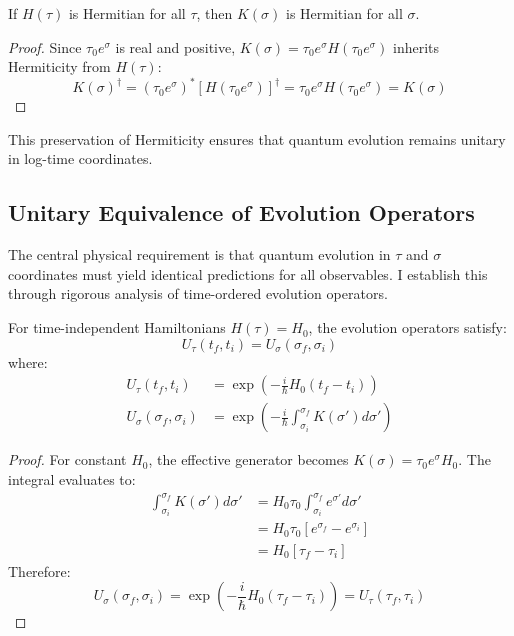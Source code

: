 \begin{corollary}
If $H(\tau)$ is Hermitian for all $\tau$, then $K(\sigma)$ is Hermitian for all $\sigma$.
\end{corollary}

\begin{proof}
Since $\tau_0 e^\sigma$ is real and positive, $K(\sigma) = \tau_0 e^\sigma H(\tau_0 e^\sigma)$ inherits Hermiticity from $H(\tau)$:
\begin{equation}
K(\sigma)^\dagger = (\tau_0 e^\sigma)^* [H(\tau_0 e^\sigma)]^\dagger = \tau_0 e^\sigma H(\tau_0 e^\sigma) = K(\sigma)
\end{equation}
\end{proof}

This preservation of Hermiticity ensures that quantum evolution remains unitary in log-time coordinates.

\subsection{Unitary Equivalence of Evolution Operators}
\label{subsec:unitary_equivalence}

The central physical requirement is that quantum evolution in $\tau$ and $\sigma$ coordinates must yield identical predictions for all observables. I establish this through rigorous analysis of time-ordered evolution operators.

\begin{theorem}
\label{thm:unitary_equiv_constant}
For time-independent Hamiltonians $H(\tau) = H_0$, the evolution operators satisfy:
\begin{equation}
U_\tau(t_f, t_i) = U_\sigma(\sigma_f, \sigma_i)
\end{equation}
where:
\begin{align}
U_\tau(t_f, t_i) &= \exp\left(-\frac{i}{\hbar} H_0 (t_f - t_i)\right) \\
U_\sigma(\sigma_f, \sigma_i) &= \exp\left(-\frac{i}{\hbar} \int_{\sigma_i}^{\sigma_f} K(\sigma') d\sigma'\right)
\end{align}
\end{theorem}

\begin{proof}
For constant $H_0$, the effective generator becomes $K(\sigma) = \tau_0 e^\sigma H_0$. The integral evaluates to:
\begin{align}
\int_{\sigma_i}^{\sigma_f} K(\sigma') d\sigma' &= H_0 \tau_0 \int_{\sigma_i}^{\sigma_f} e^{\sigma'} d\sigma' \\
&= H_0 \tau_0 [e^{\sigma_f} - e^{\sigma_i}] \\
&= H_0 [\tau_f - \tau_i]
\end{align}
Therefore:
\begin{equation}
U_\sigma(\sigma_f, \sigma_i) = \exp\left(-\frac{i}{\hbar} H_0 (\tau_f - \tau_i)\right) = U_\tau(\tau_f, \tau_i)
\end{equation}
\end{proof}

